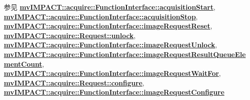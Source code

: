 \begin{DoxySeeAlso}{参见}
{\bfseries \hyperlink{classmv_i_m_p_a_c_t_1_1acquire_1_1_function_interface_a91750ec88416ca6557b1bbb10ebc5039}{mv\+I\+M\+P\+A\+C\+T\+::acquire\+::\+Function\+Interface\+::acquisition\+Start}}, ~\newline
{\bfseries \hyperlink{classmv_i_m_p_a_c_t_1_1acquire_1_1_function_interface_ab52b63727aa33cb4cc2bdd0856c0f237}{mv\+I\+M\+P\+A\+C\+T\+::acquire\+::\+Function\+Interface\+::acquisition\+Stop}}, ~\newline
{\bfseries \hyperlink{classmv_i_m_p_a_c_t_1_1acquire_1_1_function_interface_a234b2c6e31f3e83629501da47095c54f}{mv\+I\+M\+P\+A\+C\+T\+::acquire\+::\+Function\+Interface\+::image\+Request\+Reset}}, ~\newline
{\bfseries \hyperlink{classmv_i_m_p_a_c_t_1_1acquire_1_1_request_a3c30ced407d20caef49e3148257cd91e}{mv\+I\+M\+P\+A\+C\+T\+::acquire\+::\+Request\+::unlock}}, ~\newline
{\bfseries \hyperlink{classmv_i_m_p_a_c_t_1_1acquire_1_1_function_interface_a378a338217d5a681e880a0d9395f1a62}{mv\+I\+M\+P\+A\+C\+T\+::acquire\+::\+Function\+Interface\+::image\+Request\+Unlock}}, ~\newline
{\bfseries \hyperlink{classmv_i_m_p_a_c_t_1_1acquire_1_1_function_interface_a7e608625f2db03327c3fe9964967d0bc}{mv\+I\+M\+P\+A\+C\+T\+::acquire\+::\+Function\+Interface\+::image\+Request\+Result\+Queue\+Element\+Count}}, ~\newline
{\bfseries \hyperlink{classmv_i_m_p_a_c_t_1_1acquire_1_1_function_interface_a4cefdfda8e8940736ae9a4c97b6de8c9}{mv\+I\+M\+P\+A\+C\+T\+::acquire\+::\+Function\+Interface\+::image\+Request\+Wait\+For}}, ~\newline
{\bfseries \hyperlink{classmv_i_m_p_a_c_t_1_1acquire_1_1_request_a5ad02aed16acd60699f3d8757c63af43}{mv\+I\+M\+P\+A\+C\+T\+::acquire\+::\+Request\+::configure}}, ~\newline
{\bfseries \hyperlink{classmv_i_m_p_a_c_t_1_1acquire_1_1_function_interface_a05594ac5b54679152d27ac0e73b3908e}{mv\+I\+M\+P\+A\+C\+T\+::acquire\+::\+Function\+Interface\+::image\+Request\+Configure}} 
\end{DoxySeeAlso}

